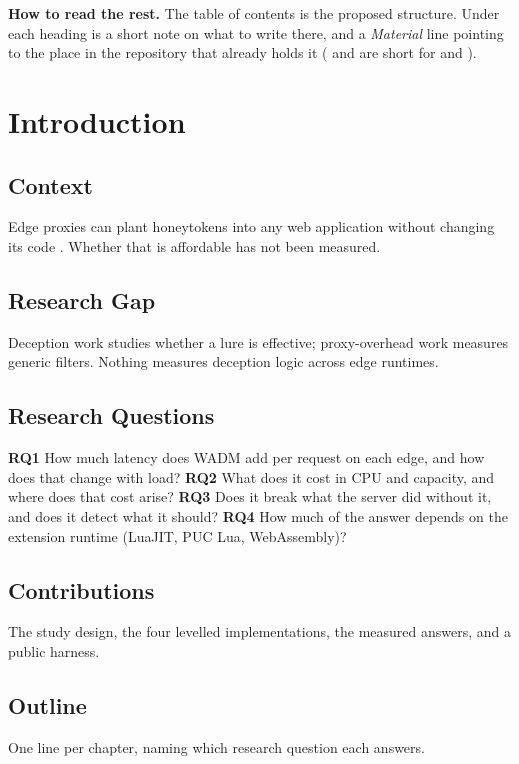 \documentclass{rptuma}
\begin{document}
\textbf{How to read the rest.} The table of contents is the proposed structure. Under each
heading is a short note on what to write there, and a \emph{Material} line pointing to the
place in the repository that already holds it ( and  are short for
 and ).

\frontmatternote

\tableofcontents
\cleardoublepage
{}

\chapter{Introduction}
\section{Context}
Edge proxies can plant honeytokens into any web application without changing its code
\cite{kahlhofer2024application}. Whether that is affordable has not been measured.

\section{Research Gap}
Deception work studies whether a lure is effective; proxy-overhead work measures generic filters.
Nothing measures deception logic across edge runtimes.

\section{Research Questions}
\textbf{RQ1} How much latency does WADM add per request on each edge, and how does that change with
load? \textbf{RQ2} What does it cost in CPU and capacity, and where does that cost arise?
\textbf{RQ3} Does it break what the server did without it, and does it detect what it should?
\textbf{RQ4} How much of the answer depends on the extension runtime (LuaJIT, PUC Lua,
WebAssembly)?

\section{Contributions}
The study design, the four levelled implementations, the measured answers, and a public harness.

\section{Outline}
One line per chapter, naming which research question each answers.
\end{document}
